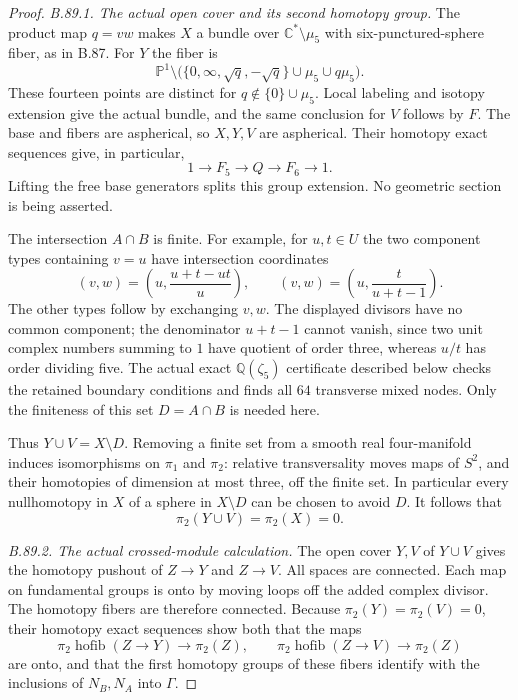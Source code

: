 \begin{proof}
\emph{B.89.1. The actual open cover and its second homotopy group.}
The product map $q=vw$ makes $X$ a bundle over
$\mathbb C^*\setminus\mu _5$ with six-punctured-sphere fiber, as in
B.87. For $Y$ the fiber is
\[
 \mathbb P^1\setminus
  \bigl(\{0,\infty,\sqrt q,-\sqrt q\}\cup\mu _5
                       \cup q\mu _5\bigr).
\]
These fourteen points are distinct for $q\notin\{0\}\cup\mu _5$.
Local labeling and isotopy extension give the actual bundle, and the
same conclusion for $V$ follows by $F$. The base and fibers are
aspherical, so $X,Y,V$ are aspherical. Their homotopy exact sequences
give, in particular,
\begin{equation}\label{eq:B89-free-by-free}
 1\longrightarrow F_5\longrightarrow Q\longrightarrow F_6
       \longrightarrow1.
\end{equation}
Lifting the free base generators splits this group extension. No
geometric section is being asserted.

The intersection $A\cap B$ is finite. For example, for $u,t\in U$
the two component types containing $v=u$ have intersection coordinates
\[
 (v,w)=\left(u,\frac{u+t-ut}{u}\right),\qquad
 (v,w)=\left(u,\frac{t}{u+t-1}\right).
\]
The other types follow by exchanging $v,w$. The displayed divisors
have no common component; the denominator $u+t-1$ cannot vanish,
since two unit complex numbers summing to $1$ have quotient of order
three, whereas $u/t$ has order dividing five. The actual exact
$\mathbb Q(\zeta _5)$ certificate described below checks the retained
boundary conditions and finds all $64$ transverse mixed nodes. Only
the finiteness of this set $D=A\cap B$ is needed here.

Thus $Y\cup V=X\setminus D$. Removing a finite set from a smooth
real four-manifold induces isomorphisms on $\pi _1$ and $\pi _2$: relative
transversality moves maps of $S^2$, and their homotopies of dimension
at most three, off the finite set. In particular every nullhomotopy
in $X$ of a sphere in $X\setminus D$ can be chosen to avoid $D$.
It follows that
\begin{equation}\label{eq:B89-pi2}
 \pi _2(Y\cup V)=\pi _2(X)=0.
\end{equation}

\emph{B.89.2. The actual crossed-module calculation.}
The open cover $Y,V$ of $Y\cup V$ gives the homotopy pushout of
$Z\to Y$ and $Z\to V$. All spaces are connected. Each map on
fundamental groups is onto by moving loops off the added complex
divisor. The homotopy fibers are therefore connected. Because
$\pi _2(Y)=\pi _2(V)=0$, their homotopy exact sequences show both
that the maps
\[
 \pi _2\operatorname{hofib}(Z\to Y)\longrightarrow\pi _2(Z),
 \qquad
 \pi _2\operatorname{hofib}(Z\to V)\longrightarrow\pi _2(Z)
\]
are onto, and that the first homotopy groups of these fibers identify
with the inclusions of $N_B,N_A$ into $\Gamma$.


\end{proof}
